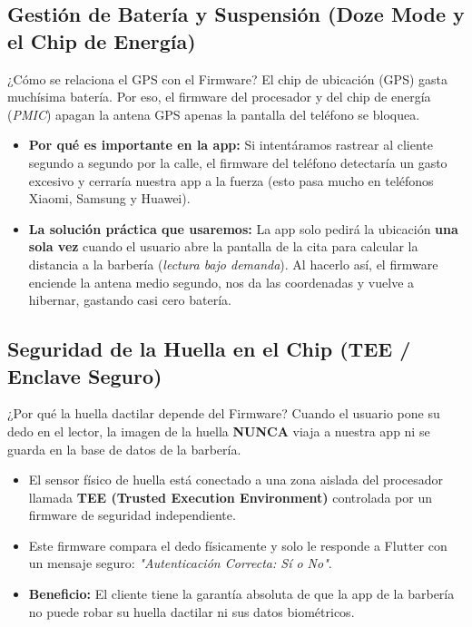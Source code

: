 \documentclass[11pt,a4paper]{article}
\begin{document}
\subsection{Gestión de Batería y Suspensión (Doze Mode y el Chip de Energía)}

\begin{firmwarebox}{¿Cómo se relaciona el GPS con el Firmware?}
El chip de ubicación (GPS) gasta muchísima batería. Por eso, el firmware del procesador y del chip de energía (\textit{PMIC}) apagan la antena GPS apenas la pantalla del teléfono se bloquea.
\end{firmwarebox}

\begin{itemize}
    \item \textbf{Por qué es importante en la app:} Si intentáramos rastrear al cliente segundo a segundo por la calle, el firmware del teléfono detectaría un gasto excesivo y cerraría nuestra app a la fuerza (esto pasa mucho en teléfonos Xiaomi, Samsung y Huawei).
    \item \textbf{La solución práctica que usaremos:} La app solo pedirá la ubicación \textbf{una sola vez} cuando el usuario abre la pantalla de la cita para calcular la distancia a la barbería (\textit{lectura bajo demanda}). Al hacerlo así, el firmware enciende la antena medio segundo, nos da las coordenadas y vuelve a hibernar, gastando casi cero batería.
\end{itemize}

\subsection{Seguridad de la Huella en el Chip (TEE / Enclave Seguro)}

\begin{firmwarebox}{¿Por qué la huella dactilar depende del Firmware?}
Cuando el usuario pone su dedo en el lector, la imagen de la huella \textbf{NUNCA} viaja a nuestra app ni se guarda en la base de datos de la barbería.
\end{firmwarebox}

\begin{itemize}
    \item El sensor físico de huella está conectado a una zona aislada del procesador llamada \textbf{TEE (Trusted Execution Environment)} controlada por un firmware de seguridad independiente.
    \item Este firmware compara el dedo físicamente y solo le responde a Flutter con un mensaje seguro: \textit{"Autenticación Correcta: Sí o No"}.
    \item \textbf{Beneficio:} El cliente tiene la garantía absoluta de que la app de la barbería no puede robar su huella dactilar ni sus datos biométricos.

\end{itemize}
\end{document}
